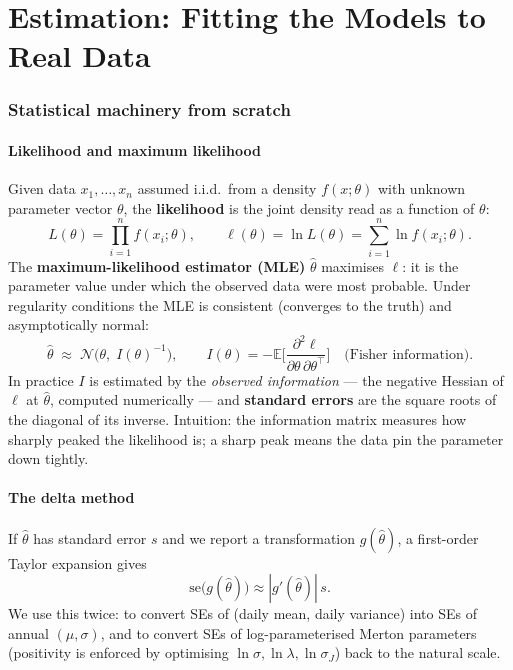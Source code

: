 \documentclass[11pt,a4paper]{article}
\newcommand{\E}{\mathbb{E}}
\newcommand{\N}{\mathcal{N}}
\begin{document}
\part{Estimation: Fitting the Models to Real Data}
\label{part:estimation}

\section{Statistical machinery from scratch}
\label{sec:statmachinery}

\subsection{Likelihood and maximum likelihood}
Given data $x_1,\dots,x_n$ assumed i.i.d.\ from a density
$f(x;\theta)$ with unknown parameter vector $\theta$, the \textbf{likelihood} is
the joint density read as a function of $\theta$:
\begin{equation}
L(\theta)=\prod_{i=1}^n f(x_i;\theta),\qquad
\ell(\theta)=\ln L(\theta)=\sum_{i=1}^n\ln f(x_i;\theta).
\end{equation}
The \textbf{maximum-likelihood estimator (MLE)} $\hat\theta$ maximises
$\ell$: it is the parameter value under which the observed data were most
probable. Under regularity conditions the MLE is consistent (converges to the
truth) and asymptotically normal:
\begin{equation}
\hat\theta\;\approx\;\N\big(\theta,\; I(\theta)^{-1}\big),\qquad
I(\theta)=-\E\Big[\frac{\partial^2\ell}{\partial\theta\,\partial\theta^{\top}}\Big]
\quad\text{(Fisher information)}.
\label{eq:mleasymp}
\end{equation}
In practice $I$ is estimated by the \emph{observed information} --- the negative
Hessian of $\ell$ at $\hat\theta$, computed numerically --- and
\textbf{standard errors} are the square roots of the diagonal of its inverse.
Intuition: the information matrix measures how sharply peaked the likelihood is;
a sharp peak means the data pin the parameter down tightly.

\subsection{The delta method}
If $\hat\theta$ has standard error $s$ and we report a transformation
$g(\hat\theta)$, a first-order Taylor expansion gives
\begin{equation}
\text{se}\big(g(\hat\theta)\big)\approx|g'(\hat\theta)|\,s .
\label{eq:delta}
\end{equation}
We use this twice: to convert SEs of (daily mean, daily variance) into SEs of
annual $(\mu,\sigma)$, and to convert SEs of log-parameterised Merton
parameters (positivity is enforced by optimising $\ln\sigma,\ln\lambda,
\ln\sigma_J$) back to the natural scale.
\end{document}
